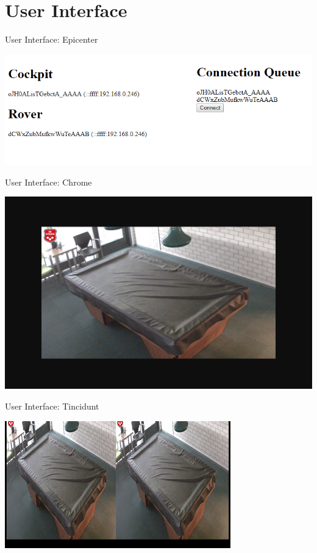 \documentclass{beamer}
\begin{document}
\section{User Interface}
\begin{frame}{User Interface: Epicenter}
\begin{center}
	\includegraphics[width=\linewidth]{images/epicenter.png}
\end{center}
\end{frame}
\begin{frame}{User Interface: Chrome}
    \begin{center}
		\includegraphics[width=\linewidth]{images/chrome.png}
	\end{center}
\end{frame}
\begin{frame}{User Interface: Tincidunt}
    \begin{center}
		\includegraphics[width=\linewidth]{images/tincidunt.png}
	\end{center}
\end{frame}
\end{document}
